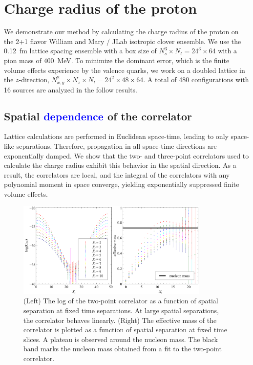 \documentclass{PoS}
\newcommand{\kno}[1]{\textcolor{blue}{#1}}
\begin{document}
\section{Charge radius of the proton}
We demonstrate our method by calculating the charge radius of the proton on the 2+1 flavor William and Mary / JLab isotropic clover ensemble.  We use the 0.12~fm lattice spacing ensemble with a box size of $N_s^3\times N_t = 24^3\times 64$ with a pion mass of 400~MeV. To minimize the dominant error, which is the finite volume effects experience by the valence quarks, we work on a doubled lattice in the $z$-direction,  $N_{x,y}^2 \times N_z \times N_t = 24^2\times 48\times 64$.  A total of 480 configurations with 16 sources are analyzed in the follow results.

\subsection{Spatial \kno{dependence} of the correlator}
Lattice calculations are performed in Euclidean space-time, leading to only space-like separations.  Therefore, propagation in all space-time directions are exponentially damped. We show that the two- and three-point correlators used to calculate the charge radius exhibit this behavior in the spatial direction. As a result, the correlators are local, and the integral of the correlators with any polynomial moment in space converge, yielding exponentially suppressed finite volume effects.

\begin{figure}[h]
	\centering
		\includegraphics[width=0.85\textwidth]{./2ptzcorr.pdf}
	\caption{(Left) The log of the two-point correlator as a function of spatial separation at fixed time separations. At large spatial separations, the correlator behaves linearly.  (Right) The effective mass of the correlator is plotted as a function of spatial separation at fixed time slices.  A plateau is observed around the nucleon mass. The black band marks the nucleon mass obtained from a fit to the two-point correlator.}
	\label{fig:2pt_zcorr}
\end{figure}
\end{document}
